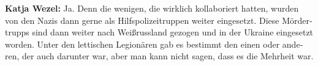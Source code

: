 \begin{otherlanguage}{ngerman}
\textbf{Katja Wezel:} Ja. Denn die wenigen, die wirklich kollaboriert hatten, wurden von den Nazis dann gerne als Hilfspolizeitruppen weiter eingesetzt. Diese Mördertrupps sind dann weiter nach Weißrussland gezogen und in der Ukraine eingesetzt worden. Unter den lettischen Legionären gab es bestimmt den einen oder anderen, der auch darunter war, aber man kann nicht sagen, dass es die Mehrheit war.






\end{otherlanguage}
